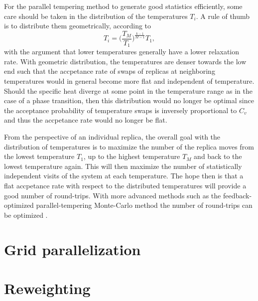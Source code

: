 For the parallel tempering method to generate good statistics efficiently, some care should be taken in the distribution of the temperatures $T_i$.
A rule of thumb is to distribute them geometrically, \ie according to
\begin{equation}
    \label{eq:Monte:PT:geometricTemperatures}
    T_i = \bigg(\frac{T_M}{T_1}\bigg)^{\frac{k-1}{M-1}}T_1,
\end{equation}
with the argument that lower temperatures generally have a lower relaxation rate. With geometric distribution, the temperatures are denser towards
the low end such that the accpetance rate of swaps of replicas at neighboring temperatures would in general become more flat and independent of temperature.
Should the specific heat diverge at some point in the temperature range as in the case of a phase transition, then this distribution would no
longer be optimal since the acceptance probability of temperature swaps is inversely proportional to $C_v$ and thus the accpetance rate would no
longer be flat.

From the perspective of an individual replica, the overall goal with the distribution of temperatures is to maximize the number of the replica moves
from the lowest temperature $T_1$, up to the highest temperature $T_M$ and back to the lowest temperature again. This will then maximize the number
of statistically independent visits of the system at each temperature. The hope then is that a flat accpetance rate with respect to the distributed
temperatures will provide a good number of round-trips. With more advanced methods such as the feedback-optimized parallel-tempering Monte-Carlo
method the number of round-trips can be optimized \cite{Katzgraber06}.

\section{Grid parallelization}

\section{Reweighting}
